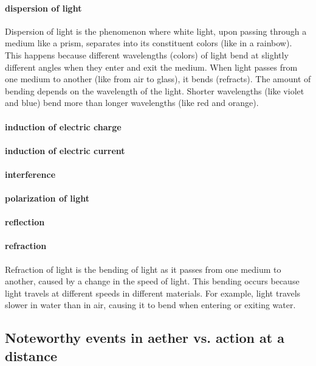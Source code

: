 \documentclass[a4paper]{article}
\theoremstyle{plain}
\theoremstyle{definition}
\begin{document}
\paragraph{dispersion of light}

Dispersion of light is the phenomenon where white light, upon passing
through a medium like a prism, separates into its constituent colors
(like in a rainbow).  This happens because different wavelengths
(colors) of light bend at slightly different angles when they enter
and exit the medium.  When light passes from one medium to another
(like from air to glass), it bends (refracts).  The amount of bending
depends on the wavelength of the light.  Shorter wavelengths (like
violet and blue) bend more than longer wavelengths (like red and
orange).

\paragraph{induction of electric charge}

\paragraph{induction of electric current}

\paragraph{interference}

\paragraph{polarization of light}

\paragraph{reflection}

\paragraph{refraction}

Refraction of light is the bending of light as it passes from one
medium to another, caused by a change in the speed of light.  This
bending occurs because light travels at different speeds in different
materials. For example, light travels slower in water than in air,
causing it to bend when entering or exiting water.


\subsection{Noteworthy events in aether vs. action at a distance}
\end{document}

